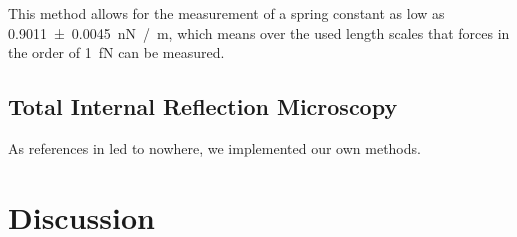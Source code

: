 \documentclass[
    twoside=false,
    twocolumn=true,
    fontsize=11pt,
]{scrarticle}
\begin{document}
This method allows for the measurement of a spring constant as low as \SI{0.9011(45)}{\nano N /m}, which means over the used length scales that forces in the order of \SI{1}{\femto N} can be measured.

\subsection{Total Internal Reflection Microscopy}
As references in \cite{instructions} led to nowhere, we implemented our own methods.

\section{Discussion}

\nocite{*}
\printbibliography
\end{document}
